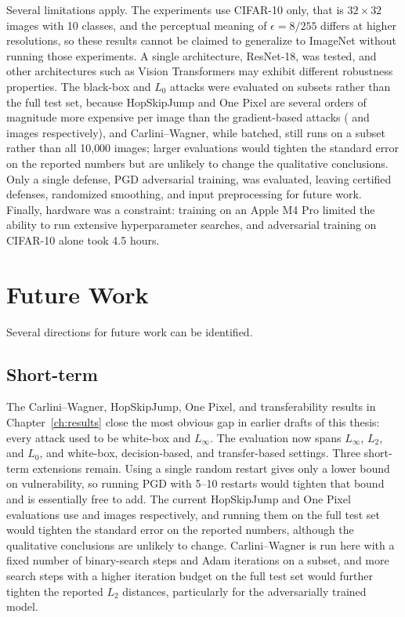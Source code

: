 Several limitations apply. The experiments use CIFAR-10 only, that is $32 \times 32$ images with 10 classes, and the perceptual meaning of $\epsilon = 8/255$ differs at higher resolutions, so these results cannot be claimed to generalize to ImageNet without running those experiments. A single architecture, ResNet-18, was tested, and other architectures such as Vision Transformers may exhibit different robustness properties. The black-box and $L_0$ attacks were evaluated on subsets rather than the full test set, because HopSkipJump and One Pixel are several orders of magnitude more expensive per image than the gradient-based attacks (\HSJN{} and \OPN{} images respectively), and Carlini--Wagner, while batched, still runs on a subset rather than all 10{,}000 images; larger evaluations would tighten the standard error on the reported numbers but are unlikely to change the qualitative conclusions. Only a single defense, PGD adversarial training, was evaluated, leaving certified defenses, randomized smoothing, and input preprocessing for future work. Finally, hardware was a constraint: training on an Apple M4 Pro limited the ability to run extensive hyperparameter searches, and adversarial training on CIFAR-10 alone took 4.5 hours.

\section{Future Work}
\label{sec:future_work}

Several directions for future work can be identified.

\subsection{Short-term}

The Carlini--Wagner, HopSkipJump, One Pixel, and transferability results in Chapter~\ref{ch:results} close the most obvious gap in earlier drafts of this thesis: every attack used to be white-box and $L_\infty$. The evaluation now spans $L_\infty$, $L_2$, and $L_0$, and white-box, decision-based, and transfer-based settings. Three short-term extensions remain. Using a single random restart gives only a lower bound on vulnerability, so running PGD with 5--10 restarts would tighten that bound and is essentially free to add. The current HopSkipJump and One Pixel evaluations use \HSJN{} and \OPN{} images respectively, and running them on the full test set would tighten the standard error on the reported numbers, although the qualitative conclusions are unlikely to change. Carlini--Wagner is run here with a fixed number of binary-search steps and Adam iterations on a subset, and more search steps with a higher iteration budget on the full test set would further tighten the reported $L_2$ distances, particularly for the adversarially trained model.

